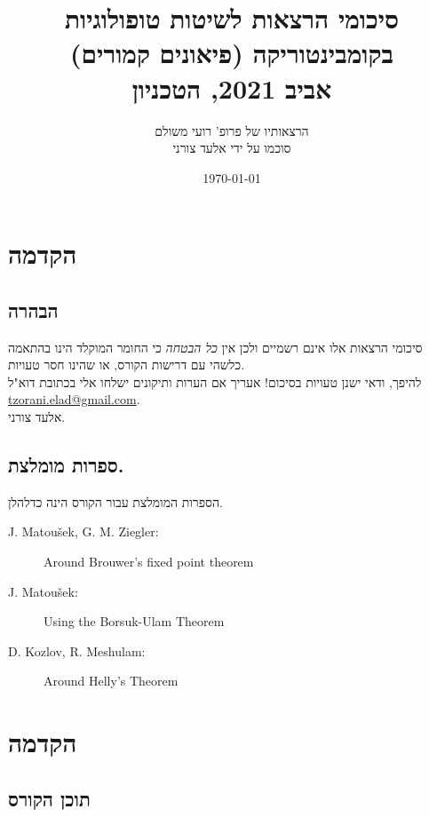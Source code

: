\documentclass[a4paper,10pt,twoside,openany]{book}
\title{סיכומי הרצאות לשיטות טופולוגיות בקומבינטוריקה (פיאונים קמורים) \\ \large{אביב 2021, הטכניון}}
\author{הרצאותיו של פרופ' רועי משולם \\ \large סוכמו על ידי אלעד צורני}
\date{\today}
\begin{document}
\frontmatter
{}
\tableofcontents
\countlectures
\newpage

\chapter*{הקדמה}
 

\section*{הבהרה}

סיכומי הרצאות אלו אינם רשמיים ולכן אין
\emph{כל הבטחה}
כי החומר המוקלד הינו בהתאמה כלשהי עם דרישות הקורס, או שהינו חסר טעויות.
\\
להיפך, ודאי ישנן טעויות בסיכום! אעריך אם הערות ותיקונים ישלחו אלי בכתובת דוא"ל
\textenglish{\href{mailto:tzorani.elad@gmail.com}{tzorani.elad@gmail.com}}.\\
אלעד צורני.

\section*{ספרות מומלצת.} %

הספרות המומלצת עבור הקורס הינה כדלהלן.

\begin{english}
\begin{description}
\item[J. Matoušek, G. M. Ziegler:] Around Brouwer’s fixed point theorem

\item[J. Matoušek:] Using the Borsuk-Ulam Theorem

\item[D. Kozlov, R. Meshulam:] Around Helly's Theorem
\end{description}
\end{english}

\mainmatter

\chapter*{הקדמה}
\section{תוכן הקורס}
\end{document}
